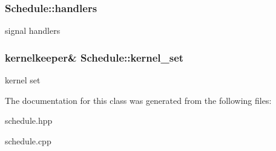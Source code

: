 \subsubsection[{handlers}]{ Schedule\+::handlers\hspace{0.3cm}{\ttfamily [protected]}}\label{class_schedule_ad248e99611a87776fb411836cd46a603}
signal handlers \hypertarget{class_schedule_a1a448b0d48e656f94db65a70cedd8eed}{}
\subsubsection[{kernel\+\_\+set}]{\setlength{\rightskip}{0pt plus 5cm}kernelkeeper\& Schedule\+::kernel\+\_\+set\hspace{0.3cm}{\ttfamily [protected]}}\label{class_schedule_a1a448b0d48e656f94db65a70cedd8eed}
kernel set 

The documentation for this class was generated from the following files\+:\begin{DoxyCompactItemize}
\item 
schedule.\+hpp\item 
schedule.\+cpp\end{DoxyCompactItemize}

